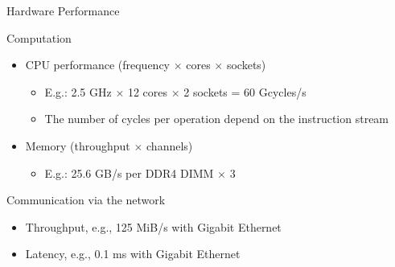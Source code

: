 \documentclass[compress,11pt,xcolor=svgnames,aspectratio=169]{beamer}
\begin{document}
\begin{frame}[fragile]{Hardware Performance}

\begin{block}{Computation}

\begin{itemize}
\setlength\itemsep{0.2cm}

  \item CPU performance (frequency $\times$ cores $\times$ sockets)

    \begin{itemize}
    \item E.g.: 2.5 GHz $\times$ 12 cores $\times$ 2 sockets = 60 Gcycles/s
    \item The number of cycles per operation depend on the instruction stream
    \end{itemize}

  \item Memory (throughput $\times$ channels)

    \begin{itemize}
    \item E.g.: 25.6 GB/s per DDR4 DIMM $\times$ 3
    \end{itemize}

\end{itemize}

\end{block}

\begin{block}{Communication via the network}

\begin{itemize}
\setlength\itemsep{0.2cm}

  \item Throughput, e.g., 125 MiB/s with Gigabit Ethernet
  \item Latency, e.g., 0.1 ms with Gigabit Ethernet

\end{itemize}

\end{block}

\end{frame}
\end{document}
